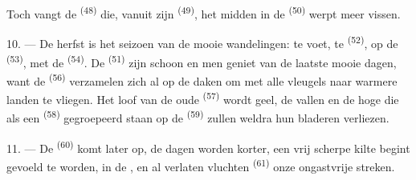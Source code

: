 Toch vangt de  \textsuperscript{(48)} die, vanuit zijn
 \textsuperscript{(49)}, het  midden in de
 \textsuperscript{(50)} werpt meer vissen.

10. --- De herfst is het seizoen van de mooie wandelingen: te voet, te
 \textsuperscript{(52)}, op de 
\textsuperscript{(53)}, met de  \textsuperscript{(54)}. De
 \textsuperscript{(51)} zijn schoon en men geniet van de laatste
mooie dagen, want de  \textsuperscript{(56)} verzamelen zich al op de daken
om met alle vleugels naar warmere landen te vliegen. Het loof van de oude 
\textsuperscript{(57)} wordt geel, de
 vallen en de hoge  die als een 
\textsuperscript{(58)} gegroepeerd staan op de  \textsuperscript{(59)} zullen
weldra hun bladeren verliezen.

11. --- De  \textsuperscript{(60)} komt later op, de dagen worden korter, een vrij
scherpe kilte begint gevoeld te worden, in de , en al verlaten vluchten
 \textsuperscript{(61)} onze ongastvrije streken.
\VUsaut{6.0mm}
\VUfilet{22mm}
